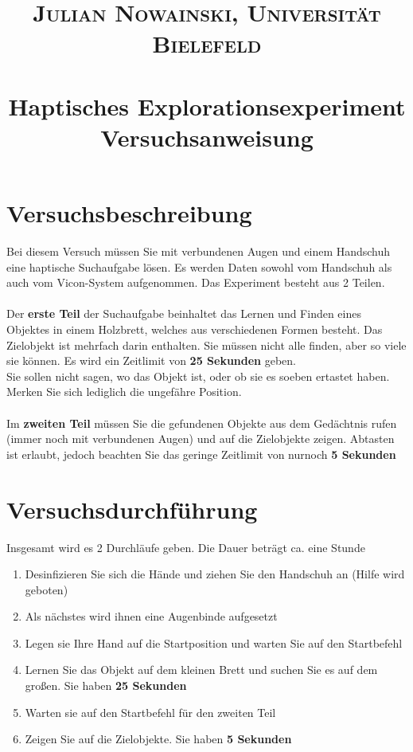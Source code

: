 \documentclass[paper=a4, fontsize=11pt]{scrartcl} %
\title{	
\normalfont \normalsize 
\textsc{Julian Nowainski, Universität Bielefeld} \\ [5pt] %
\horrule{0.5pt} \\[0.4cm] %
\huge Haptisches Explorationsexperiment \\ %
\large Versuchsanweisung
\horrule{2pt} \\[0.5cm] %
\date{\vspace{-10ex}} %
}
\numberwithin{equation}{section} %
\numberwithin{figure}{section} %
\numberwithin{table}{section} %
\begin{document}
\maketitle %


\section{Versuchsbeschreibung}
Bei diesem Versuch müssen Sie mit verbundenen Augen und einem Handschuh eine haptische Suchaufgabe lösen. Es werden Daten sowohl vom Handschuh als auch vom Vicon-System aufgenommen. Das Experiment besteht aus 2 Teilen. \\\\
Der \textbf{erste Teil} der Suchaufgabe beinhaltet das Lernen und Finden eines Objektes in einem Holzbrett, welches aus verschiedenen Formen besteht. Das Zielobjekt ist mehrfach darin enthalten. Sie müssen nicht alle finden, aber so viele sie können. Es wird ein Zeitlimit von \textbf{25 Sekunden} geben. \\
Sie sollen nicht sagen, wo das Objekt ist, oder ob sie es soeben ertastet haben. Merken Sie sich lediglich die ungefähre Position.\\\\
Im \textbf{zweiten Teil} müssen Sie die gefundenen Objekte aus dem Gedächtnis rufen (immer noch mit verbundenen Augen) und auf die Zielobjekte zeigen. Abtasten ist erlaubt, jedoch beachten Sie das geringe Zeitlimit von nurnoch \textbf{5 Sekunden}



\section{Versuchsdurchführung}
Insgesamt wird es 2 Durchläufe geben. Die Dauer beträgt ca. eine Stunde

\begin{enumerate}
\item Desinfizieren Sie sich die Hände und ziehen Sie den Handschuh an (Hilfe wird geboten)
\item Als nächstes wird ihnen eine Augenbinde aufgesetzt
\item Legen sie Ihre Hand auf die Startposition und warten Sie auf den Startbefehl
\item Lernen Sie das Objekt auf dem kleinen Brett und suchen Sie es auf dem großen. Sie haben \textbf{25 Sekunden}
\item Warten sie auf den Startbefehl für den zweiten Teil
\item Zeigen Sie auf die Zielobjekte. Sie haben \textbf{5 Sekunden}
\end{enumerate}



\end{document}
